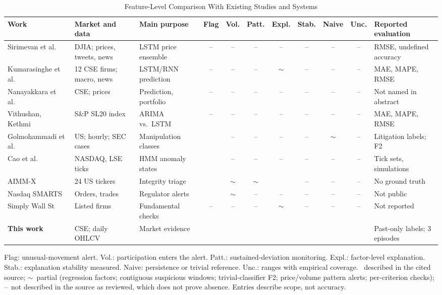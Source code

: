 \documentclass[conference]{IEEEtran}
\newcommand{\yes}{\ding{51}}
\newcommand{\prt}{$\sim$}
\newcommand{\no}{--}
\begin{document}
\begin{table}[!t]
\caption{Feature-Level Comparison With Existing Studies and Systems}
\label{tab:compare}
\centering
\footnotesize
\setlength{\tabcolsep}{2.7pt}
\renewcommand{\arraystretch}{1.05}
\begin{tabular}{@{}l l l c c c c c c c l@{}}
\toprule
Work & Market and data & Main purpose & Flag & Vol. & Patt. & Expl. & Stab. & Naive & Unc. & Reported evaluation \\
\midrule
Sirimevan et al.~\cite{sirimevan2019} & DJIA; prices, tweets, news & LSTM price ensemble & \no & \no & \no & \no & \no & \no & \no & RMSE, undefined accuracy \\
Kumarasinghe et al.~\cite{kumarasinghe2019} & 12 CSE firms; macro, news & LSTM/RNN prediction & \no & \no & \no & \prt & \no & \no & \no & MAE, MAPE, RMSE \\
Nanayakkara et al.~\cite{nanayakkara2021} & CSE; prices & Prediction, portfolio & \no & \no & \no & \no & \no & \no & \no & Not named in abstract \\
Vithushan, Kethmi~\cite{vithushan2025} & S\&P SL20 index & ARIMA vs.\ LSTM & \no & \no & \no & \no & \no & \no & \no & MAE, MAPE, RMSE \\
Golmohammadi et al.~\cite{golmohammadi2014} & US; hourly; SEC cases & Manipulation classes & \yes & \no & \no & \no & \no & \prt & \no & Litigation labels; F2 \\
Cao et al.~\cite{cao2015} & NASDAQ, LSE ticks & HMM anomaly states & \yes & \no & \no & \no & \no & \no & \no & Tick sets, simulations \\
AIMM-X~\cite{neela2026} & 24 US tickers & Integrity triage & \yes & \prt & \prt & \yes & \no & \no & \no & No ground truth \\
Nasdaq SMARTS~\cite{ciro_smarts,dailymirror_sec2024} & Orders, trades & Regulator alerts & \yes & \prt & \no & \no & \no & \no & \no & Not public \\
Simply Wall St~\cite{simplywallst_snowflake} & Listed firms & Fundamental checks & \no & \no & \no & \prt & \no & \no & \no & Not reported \\
\midrule
\textbf{This work} & CSE; daily OHLCV & Market evidence & \yes & \yes & \yes & \yes & \yes & \yes & \yes & Past-only labels; 3 episodes \\
\bottomrule
\end{tabular}

\vspace{2pt}
\parbox{\textwidth}{\scriptsize Flag: unusual-movement alert. Vol.: participation enters the alert. Patt.: sustained-deviation monitoring. Expl.: factor-level explanation. Stab.: explanation stability measured. Naive: persistence or trivial reference. Unc.: ranges with empirical coverage. \yes\ described in the cited source; \prt\ partial (regression factors; contiguous suspicious windows; trivial-classifier F2; price/volume pattern alerts; per-criterion checks); \no\ not described in the source as reviewed, which does not prove absence. Entries describe scope, not accuracy.}
\end{table}
\end{document}
